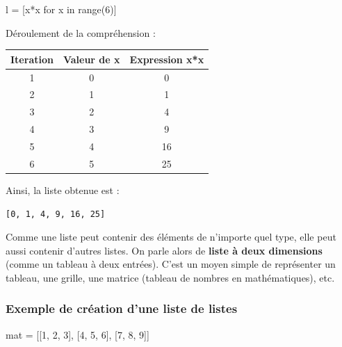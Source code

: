 \documentclass[11pt]{article}
\begin{document}
		\begin{python}
		l = [x*x for x in range(6)]\end{python}
		
		Déroulement de la compréhension :
		
		\begin{center}
			\begin{tabular}{|c|c|c|}
				\hline
				\textbf{Iteration} & \textbf{Valeur de x} & \textbf{Expression x*x} \\
				\hline
				1 & 0 & 0 \\
				\hline
				2 & 1 & 1 \\
				\hline
				3 & 2 & 4 \\
				\hline
				4 & 3 & 9 \\
				\hline
				5 & 4 & 16 \\
				\hline
				6 & 5 & 25 \\
				\hline
			\end{tabular}
		\end{center}
		
		Ainsi, la liste obtenue est :
		
		\begin{center}
			\texttt{[0, 1, 4, 9, 16, 25]}
		\end{center}
		
		\medskip
		
		
		
		
		Comme une liste peut contenir des éléments de n’importe quel type, elle peut aussi contenir
		d’autres listes.  
		On parle alors de \textbf{liste à deux dimensions} (comme un tableau à deux entrées).  
		C’est un moyen simple de représenter un tableau, une grille, une matrice (tableau de nombres en mathématiques), etc.
		
		\medskip
		
		\subsubsection*{Exemple de création d'une liste de listes}
		
		\begin{python}
		mat = [[1, 2, 3], [4, 5, 6], [7, 8, 9]]\end{python}
		
		\bigskip
		
\end{document}
